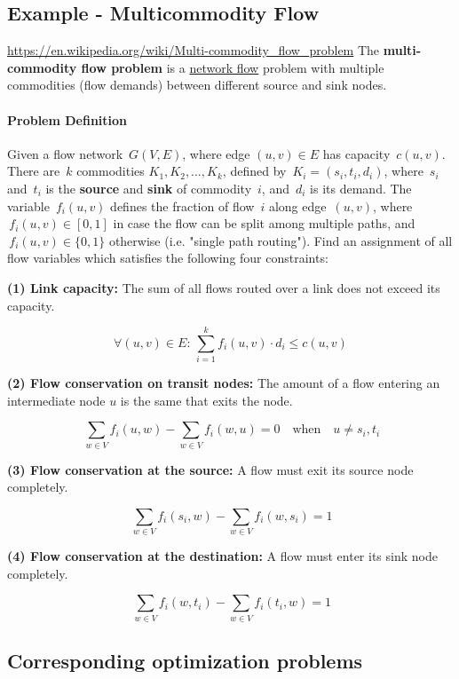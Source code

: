 \begin{enumerate}
\subsection{Example - Multicommodity Flow}

\url{https://en.wikipedia.org/wiki/Multi-commodity_flow_problem}
The \textbf{multi-commodity flow problem} is a
\href{flow_network}{network flow} problem with multiple commodities
(flow demands) between different source and sink nodes.

\paragraph{Problem Definition}

Given a flow network \(\,G(V,E)\), where edge \((u,v) \in E\) has
capacity \(\,c(u,v)\). There are \(\,k\) commodities
\(K_1,K_2,\dots,K_k\), defined by \(\,K_i=(s_i,t_i,d_i)\), where
\(\,s_i\) and \(\,t_i\) is the \textbf{source} and \textbf{sink} of
commodity \(\,i\), and \(\,d_i\) is its demand. The variable
\(\,f_i(u,v)\) defines the fraction of flow \(\,i\) along edge
\(\,(u,v)\), where \(\,f_i(u,v) \in [0,1]\) in case the flow can be
split among multiple paths, and \(\,f_i(u,v) \in \{0,1\}\) otherwise
(i.e. "single path routing"). Find an assignment of all flow variables
which satisfies the following four constraints:

\textbf{(1) Link capacity:} The sum of all flows routed over a link does
not exceed its capacity.

\[\forall (u,v)\in E:\,\sum_{i=1}^{k} f_i(u,v)\cdot d_i \leq c(u,v)\]

\textbf{(2) Flow conservation on transit nodes:} The amount of a flow
entering an intermediate node \(u\) is the same that exits the node.

\[\,\sum_{w \in V} f_i(u,w) - \sum_{w \in V} f_i(w,u) = 0 \quad \mathrm{when} \quad u \neq s_i, t_i\]

\textbf{(3) Flow conservation at the source:} A flow must exit its
source node completely.

\[\,\sum_{w \in V} f_i(s_i,w) - \sum_{w \in V} f_i(w,s_i) = 1\]

\textbf{(4) Flow conservation at the destination:} A flow must enter its
sink node completely.

\[\,\sum_{w \in V} f_i(w,t_i) - \sum_{w \in V} f_i(t_i,w) = 1\]

\hypertarget{corresponding-optimization-problems}{%
\subsection{Corresponding optimization
problems}\label{corresponding-optimization-problems}}


\end{enumerate}
